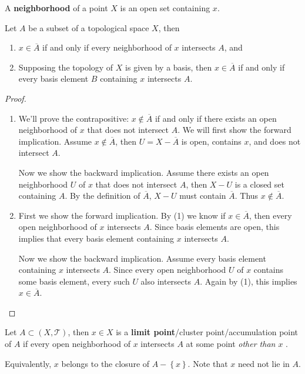 \documentclass[10pt]{report}
\begin{document}
\begin{defn}
A \textbf{neighborhood} of a point $X$ is an open set containing $x$.
\end{defn}

\begin{thrm}
	\label{thrm:nhood-closure}
Let $A$ be a subset of a topological space $X$, then
\begin{enumerate}
	\item $x \in \overline{A}$ if and only if every neighborhood of $x$ intersects $A$, and
	\item Supposing the topology of $X$ is given by a basis, then $x \in \overline{A}$ if and only if every basis element $B$ containing $x$ intersects $A$.
\end{enumerate}
\end{thrm}
\begin{proof}
	\begin{enumerate}
		\item We'll prove the contrapositive: $x \not\in \overline{A}$ if and only if there exists an open neighborhood of $x$ that does not intersect $A$. We will first show the forward implication. Assume $x \not\in \overline{A}$, then $U = X-\overline{A}$ is open, contains $x$, and does not intersect $A$.

			Now we show the backward implication. Assume there exists an open neighborhood $U$ of $x$ that does not intersect $A$, then $X-U$ is a closed set containing $A$. By the definition of $\overline{A}$, $X-U$ must contain $\overline{A}$. Thus $x \not\in \overline{A}$.

		\item First we show the forward implication. By (1) we know if $x \in  \overline{A}$, then every open neighborhood of $x$ intersects $A$. Since basis elements are open, this implies that every basis element containing $x$ intersects $A$.

			Now we show the backward implication. Assume every basis element containing $x$ intersects $A$. Since every open neighborhood $U$ of $x$ contains some basis element, every such $U$ also intersects $A$. Again by (1), this implies $x \in \overline{A}$.
	\end{enumerate}
\end{proof}

\begin{defn}
	Let $A \subset (X,\mathcal{T})$, then $x \in X$ is a \textbf{limit point}/cluster point/accumulation point of $A$ if every open neighborhood of $x$ intersects $A$ at some point \textit{other than $x$ }.

	Equivalently, $x$ belongs to the closure of $A - \left\{ x \right\}$. Note that $x$ need not lie in $A$.
\end{defn}
\end{document}
